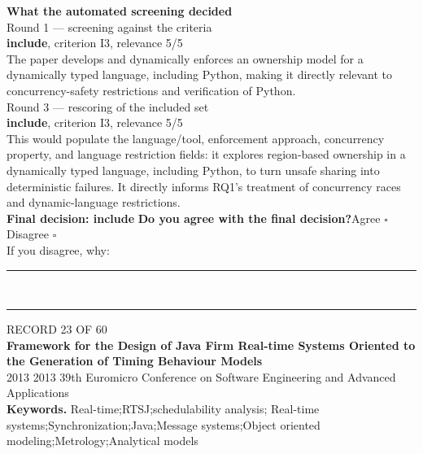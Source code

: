 \documentclass[11pt,a4paper]{article}
\begin{document}
\vspace{3mm}
\vspace{2.5mm}
{\small\textbf{What the automated screening decided}}\\[2mm]
{\footnotesize\color{soft}Round 1 --- screening against the criteria}\\[0.5mm]
{\small\textbf{include}, criterion I3, relevance 5/5}\\[0.5mm]
{\small The paper develops and dynamically enforces an ownership model for a dynamically typed language, including Python, making it directly relevant to concurrency-safety restrictions and verification of Python.}\\[2.5mm]
{\footnotesize\color{soft}Round 3 --- rescoring of the included set}\\[0.5mm]
{\small\textbf{include}, criterion I3, relevance 5/5}\\[0.5mm]
{\small This would populate the language/tool, enforcement approach, concurrency property, and language restriction fields: it explores region-based ownership in a dynamically typed language, including Python, to turn unsafe sharing into deterministic failures. It directly informs RQ1's treatment of concurrency races and dynamic-language restrictions.}\\[2.5mm]
{\small\textbf{Final decision: include}}
\vspace{2mm}
{\small\textbf{Do you agree with the final decision?}\quad{}Agree $\square$\qquad{}Disagree $\square$}\\[1mm]
{\footnotesize\color{soft}If you disagree, why:}\\[1mm]
\color{rule}\rule{\linewidth}{0.3pt}\\[3mm]\rule{\linewidth}{0.3pt}\color{black}
\clearpage
{\color{soft}\footnotesize RECORD 23 OF 60}\\[1mm]
{\large\bfseries Framework for the Design of Java Firm Real-time Systems Oriented to the Generation of Timing Behaviour Models}\\[1.5mm]
{\color{soft}\small 2013 \textperiodcentered{} 2013 39th Euromicro Conference on Software Engineering and Advanced Applications}\\[2mm]
{\small\textbf{Keywords.} Real-time;RTSJ;schedulability analysis; Real-time systems;Synchronization;Java;Message systems;Object oriented modeling;Metrology;Analytical models}\\[2mm]
\end{document}
